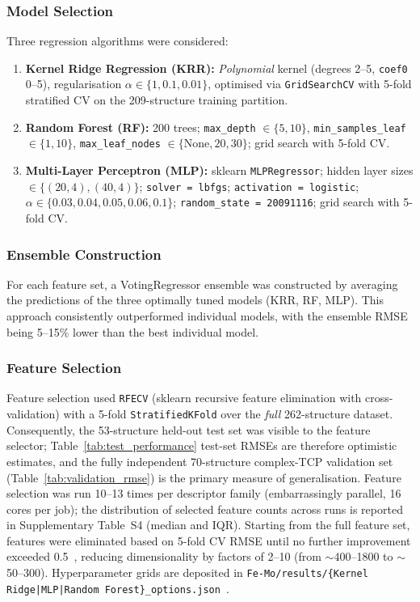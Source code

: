 \subsubsection*{Model Selection}

Three regression algorithms were considered:

\begin{enumerate}
  \item \textbf{Kernel Ridge Regression (KRR):} \emph{Polynomial} kernel (degrees 2--5, \texttt{coef0} 0--5), regularisation $\alpha \in \{1, 0.1, 0.01\}$, optimised via \texttt{GridSearchCV} with 5-fold stratified CV on the 209-structure training partition.
  \item \textbf{Random Forest (RF):} 200 trees; \texttt{max\_depth} $\in \{5, 10\}$, \texttt{min\_samples\_leaf} $\in \{1, 10\}$, \texttt{max\_leaf\_nodes} $\in \{\text{None}, 20, 30\}$; grid search with 5-fold CV.
  \item \textbf{Multi-Layer Perceptron (MLP):} sklearn \texttt{MLPRegressor}; hidden layer sizes $\in \{(20,4), (40,4)\}$; \texttt{solver~=~lbfgs}; \texttt{activation~=~logistic}; $\alpha \in \{0.03, 0.04, 0.05, 0.06, 0.1\}$; \texttt{random\_state~=~20091116}; grid search with 5-fold CV.
\end{enumerate}

\subsubsection*{Ensemble Construction}

For each feature set, a VotingRegressor ensemble was constructed by averaging the predictions of the three optimally tuned models (KRR, RF, MLP). This approach consistently outperformed individual models, with the ensemble RMSE being 5--15\% lower than the best individual model.

\subsubsection*{Feature Selection}

Feature selection used \texttt{RFECV} (sklearn recursive feature elimination with cross-validation) with a 5-fold \texttt{StratifiedKFold} over the \emph{full} 262-structure dataset. Consequently, the 53-structure held-out test set was visible to the feature selector; Table~\ref{tab:test_performance} test-set RMSEs are therefore optimistic estimates, and the fully independent 70-structure complex-TCP validation set (Table~\ref{tab:validation_rmse}) is the primary measure of generalisation. Feature selection was run 10--13 times per descriptor family (embarrassingly parallel, 16 cores per job); the distribution of selected feature counts across runs is reported in Supplementary Table~S4 (median and IQR). Starting from the full feature set, features were eliminated based on 5-fold CV RMSE until no further improvement exceeded 0.5~\meVat, reducing dimensionality by factors of 2--10 (from $\sim$400--1800 to $\sim$50--300). Hyperparameter grids are deposited in \texttt{Fe-Mo/results/\{Kernel Ridge|MLP|Random Forest\}\_options.json}~\cite{zenodo}.

